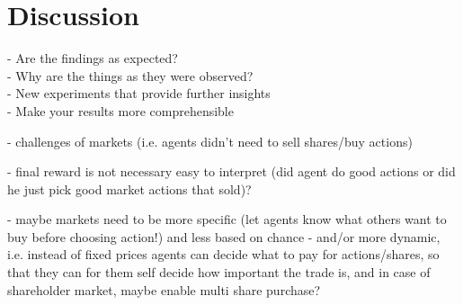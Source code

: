 %
%
\chapter{Discussion}\label{sec:Discussion}
- Are the findings as expected? \\
- Why are the things as they were observed? \\
- New experiments that provide further insights \\
- Make your results more comprehensible

- challenges of markets (i.e. agents didn't need to sell shares/buy actions)

- final reward is not necessary easy to interpret (did agent do good actions or did he just pick good market actions that sold)?

- maybe markets need to be more specific (let agents know what others want to buy before choosing action!) and less based on chance
- and/or more dynamic, i.e. instead of fixed prices agents can decide what to pay for actions/shares, so that they can for them self decide how important the trade is, and in case of shareholder market, maybe enable multi share purchase?